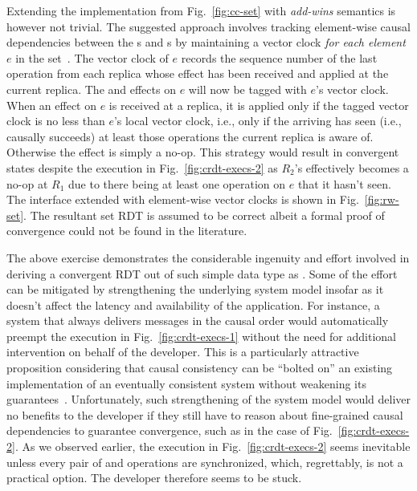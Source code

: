 Extending the  implementation from Fig.~\ref{fig:cc-set} with
\emph{add-wins} semantics is however not trivial. The suggested
approach involves tracking element-wise causal dependencies between
the s and s by maintaining a vector clock
\emph{for each element} $e$ in the set~\cite{zawirski-thesis}. The
vector clock of $e$ records the sequence number of the last  operation from each replica whose effect has been received and
applied at the current replica. The  and  effects
on $e$ will now be tagged with $e$'s vector clock. When an 
effect on $e$ is received at a replica, it is applied only if the
tagged vector clock is no less than $e$'s local vector clock, i.e.,
only if the arriving  has seen (i.e., causally succeeds) at
least those  operations the current replica is aware of.
Otherwise the effect is simply a no-op. This strategy would result in
convergent states despite the execution in Fig.~\ref{fig:crdt-execs-2}
as $R_2$'s  effectively becomes a no-op at $R_1$ due to
there being at least one  operation on $e$ that it hasn't
seen. The  interface extended with element-wise vector clocks
is shown in Fig.~\ref{fig:rw-set}. The resultant set RDT is assumed to
be correct albeit a formal proof of convergence could not be found in
the literature. 

The above exercise demonstrates the considerable ingenuity and effort
involved in deriving a convergent RDT out of such simple data type as
. Some of the effort can be mitigated by strengthening the
underlying system model insofar as it doesn't affect the latency and
availability of the application. For instance, a system that always
delivers messages in the causal order would automatically preempt the
execution in Fig.~\ref{fig:crdt-execs-1} without the need for
additional intervention on behalf of the developer. This is a
particularly attractive proposition considering that causal
consistency can be ``bolted on'' an existing implementation of an
eventually consistent system without weakening its
guarantees~\cite{bolton}. Unfortunately, such strengthening of the
system model would deliver no benefits to the developer if they still
have to reason about fine-grained causal dependencies to guarantee
convergence, such as in the case of Fig.~\ref{fig:crdt-execs-2}. As we
observed earlier, the execution in Fig.~\ref{fig:crdt-execs-2} seems
inevitable unless every pair of  and  operations
are synchronized, which, regrettably, is not a practical option. The
developer therefore seems to be stuck.

